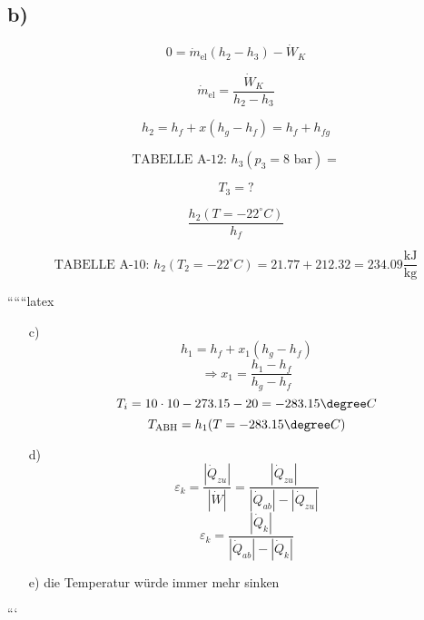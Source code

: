 \subsection*{b)}

\begin{equation*}
0 = \dot{m}_{\text{el}} \left( h_2 - h_3 \right) - \dot{W}_K
\end{equation*}

\begin{equation*}
\dot{m}_{\text{el}} = \frac{\dot{W}_K}{h_2 - h_3}
\end{equation*}

\begin{equation*}
h_2 = h_f + x \left( h_g - h_f \right) = h_f + h_{fg}
\end{equation*}

\begin{equation*}
\text{TABELLE A-12: } h_3 \left( p_3 = 8 \text{ bar} \right) = 
\end{equation*}

\begin{equation*}
T_3 = ?
\end{equation*}

\begin{equation*}
\frac{h_2 \left( T = -22^\circ C \right)}{h_f}
\end{equation*}

\begin{equation*}
\text{TABELLE A-10: } h_2 \left( T_2 = -22^\circ C \right) = 21.77 + 212.32 = 234.09 \frac{\text{kJ}}{\text{kg}}
\end{equation*}

``````latex


\begin{itemize}
    \item[c)] 
    \[
    h_1 = h_f + x_1 (h_g - h_f)
    \]
    \[
    \Rightarrow x_1 = \frac{h_1 - h_f}{h_g - h_f}
    \]
    \[
    T_i = 10 \cdot 10 - 273.15 - 20 = -283.15 \degree C
    \]
    \[
    T_{\text{ABH}} = h_1 (T = -283.15 \degree C)
    \]
    
    \item[d)] 
    \[
    \varepsilon_k = \frac{|\dot{Q}_{zu}|}{|\dot{W}|} = \frac{|\dot{Q}_{zu}|}{|\dot{Q}_{ab}| - |\dot{Q}_{zu}|}
    \]
    \[
    \varepsilon_k = \frac{|\dot{Q}_k|}{|\dot{Q}_{ab}| - |\dot{Q}_k|}
    \]
    
    \item[e)] 
    die Temperatur würde immer mehr sinken
\end{itemize}

```